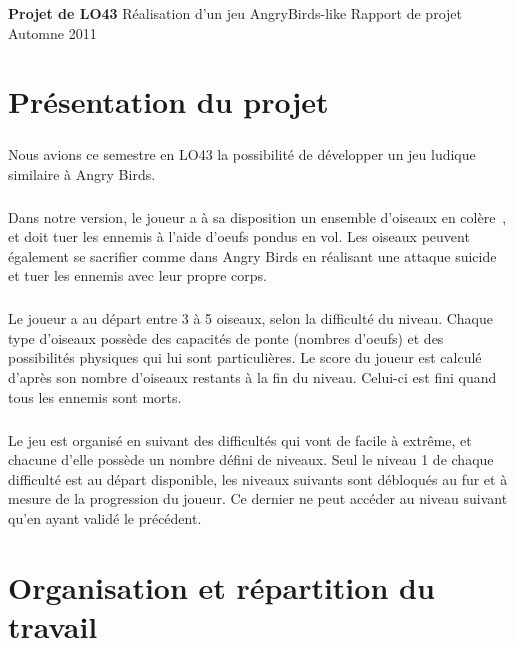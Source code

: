 \documentclass[a4paper,12pt]{report}
\begin{document}
{\textbf{Projet de LO43}} %
{Réalisation d'un jeu AngryBirds-like} %
{Rapport de projet} %
{Automne 2011} %
{} %
{} %

\tableofcontents
\chapter{Présentation du projet}
\paragraph{}Nous avions ce semestre en LO43 la possibilité de développer un jeu ludique similaire à Angry Birds.

\paragraph{}Dans notre version, le joueur a à sa disposition un ensemble d'oiseaux \guillemotleft en colère\guillemotright~, et doit tuer les ennemis à l'aide d'oeufs pondus en vol. Les oiseaux peuvent également se sacrifier comme dans Angry Birds en réalisant une \guillemotleft attaque suicide\guillemotright~ et tuer les ennemis avec leur propre corps.

\paragraph{}Le joueur a au départ entre 3 à 5 oiseaux, selon la difficulté du niveau. Chaque type d'oiseaux possède des capacités de ponte (nombres d'oeufs) et des possibilités physiques qui lui sont particulières. Le score du joueur est calculé d'après son nombre d'oiseaux restants à la fin du niveau. Celui-ci est fini quand tous les ennemis sont morts.

\paragraph{}Le jeu est organisé en suivant des difficultés qui vont de facile à extrême, et chacune d'elle possède un nombre défini de niveaux. Seul le niveau 1 de chaque difficulté est au départ disponible, les niveaux suivants sont débloqués au fur et à mesure de la progression du joueur. Ce dernier ne peut accéder au niveau suivant qu'en ayant validé le précédent.
 

\chapter{Organisation et répartition du travail}
\end{document}

